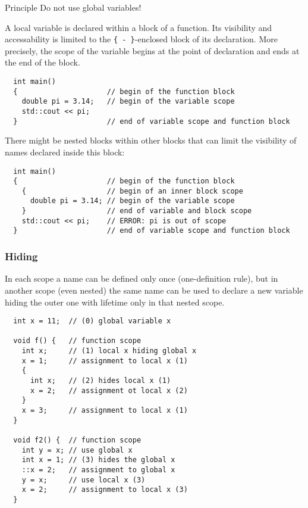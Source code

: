 \begin{guideline}{Principle}
  Do not use global variables!
\end{guideline}

A local variable is declared within a block of a function. Its visibility and accessability is limited to the \texttt{\{ - \}}-enclosed block
of its declaration. More precisely, the scope of the variable begins at the point of declaration and ends at the end of the block.
\begin{verbatim}
  int main()
  {                     // begin of the function block
    double pi = 3.14;   // begin of the variable scope
    std::cout << pi;
  }                     // end of variable scope and function block
\end{verbatim}

There might be nested blocks within other blocks that can limit the visibility of names declared inside this block:
\begin{verbatim}
  int main()
  {                     // begin of the function block
    {                   // begin of an inner block scope
      double pi = 3.14; // begin of the variable scope
    }                   // end of variable and block scope
    std::cout << pi;    // ERROR: pi is out of scope
  }                     // end of variable scope and function block
\end{verbatim}

\subsubsection{Hiding}
In each scope a name can be defined only once (one-definition rule), but in another scope (even nested) the same name can be
used to declare a new variable hiding the outer one with lifetime only in that nested scope.

\begin{verbatim}
  int x = 11;  // (0) global variable x

  void f() {   // function scope
    int x;     // (1) local x hiding global x
    x = 1;     // assignment to local x (1)
    {
      int x;   // (2) hides local x (1)
      x = 2;   // assignment ot local x (2)
    }
    x = 3;     // assignment to local x (1)
  }

  void f2() {  // function scope
    int y = x; // use global x
    int x = 1; // (3) hides the global x
    ::x = 2;   // assignment to global x
    y = x;     // use local x (3)
    x = 2;     // assignment to local x (3)
  }
\end{verbatim}

